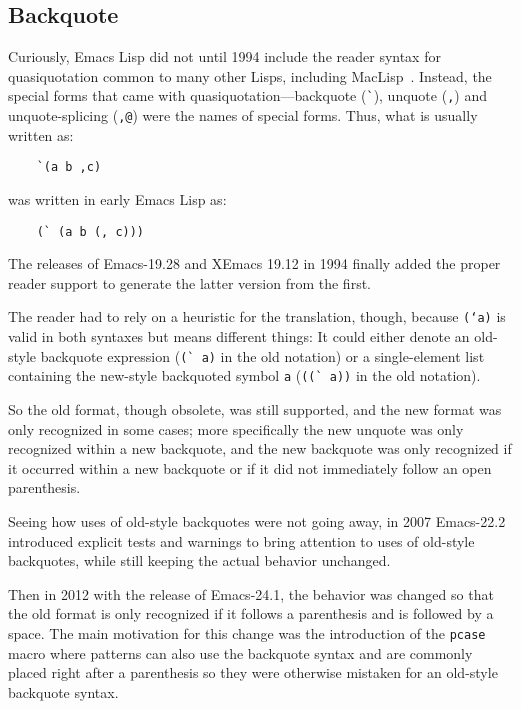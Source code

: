 \documentclass[format=acmsmall, review]{acmart}
\newcommand \Elisp {Emacs Lisp}
\begin{document}
\subsection{Backquote}
\label{sec:backquote}

Curiously, \Elisp{} did not until 1994 include the reader syntax for
quasiquotation common to many other Lisps, including MacLisp~\cite{Bawden1999}.
Instead, the special forms that came with quasiquotation---backquote
(\verb|`|), unquote (\verb|,|) and unquote-splicing (\verb|,@|) were
the names of special forms.   Thus, what is usually written as:
\begin{verbatim}
    `(a b ,c)
\end{verbatim}
was written in early \Elisp{} as:
\begin{verbatim}
    (` (a b (, c)))
\end{verbatim}
The releases of Emacs-19.28 and XEmacs 19.12 in 1994 finally added the
proper reader support to generate the latter version from the first.

The reader had to rely on a heuristic for the translation, though,
because \texttt{(`a)} is valid in both syntaxes but means different
things: It could either denote an old-style backquote expression
(\verb|(` a)| in the old notation) or a single-element list containing
the new-style backquoted symbol \texttt{a} (\verb|((` a))| in the old
notation).

So the old format, though obsolete, was still supported, and the
new format was only recognized in some cases; more specifically the new
unquote was only recognized within a new backquote, and the new
backquote was only recognized if it occurred within a new backquote or
if it did not immediately follow an open parenthesis.

Seeing how uses of old-style backquotes were not going away, in 2007
Emacs-22.2 introduced explicit tests and warnings to bring attention to uses
of old-style backquotes, while still keeping the actual behavior unchanged.

Then in 2012 with the release of Emacs-24.1, the behavior was changed so
that the old format is only recognized if it follows a parenthesis and is
followed by a space.  The main motivation for this change was the
introduction of the \texttt{pcase} macro where patterns can also use the
backquote syntax and are commonly placed right after a parenthesis so they
were otherwise mistaken for an old-style backquote syntax.
\end{document}
